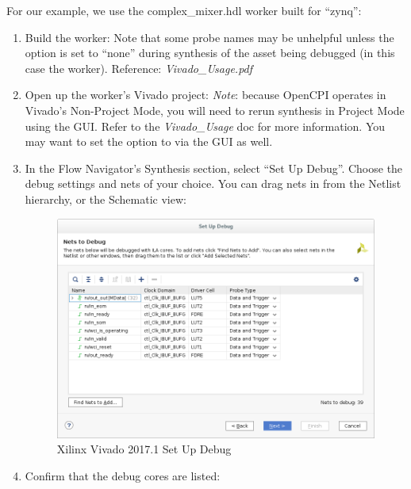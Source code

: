 \begin{flushleft}
	For our example, we use the complex\_mixer.hdl worker built for ``zynq'':
	\begin{enumerate}
		\item Build the worker:
			\subitem {}
			\subitem {}
			\subsubitem Note that some probe names may be unhelpful unless the  option is set to ``none''
			\subsubitem during synthesis of the asset being debugged (in this case the worker). Reference: \textit{Vivado\_Usage.pdf}\newline
		\item Open up the worker's Vivado project:
			\subitem {}
			\subitem {}
			\subitem \textit{Note}: because OpenCPI operates in Vivado's Non-Project Mode, you will need to rerun synthesis
			\subitem in Project Mode using the GUI. Refer to the \textit{Vivado\_Usage} doc for more information. You may want to
			\subitem set the  option to  via the GUI as well.
		\item In the Flow Navigator's Synthesis section, select ``Set Up Debug''. Choose the debug settings and nets of your choice. You can drag nets in from the Netlist hierarchy, or the Schematic view:
			\begin{figure}[H]
				\centerline{\includegraphics[scale=0.6]			{figures/xilinx_vivado_2017_set_up_debug}}
					\caption{Xilinx Vivado 2017.1 Set Up Debug}
			\end{figure}
		\item Confirm that the debug cores are listed:

\end{enumerate}
\end{flushleft}
